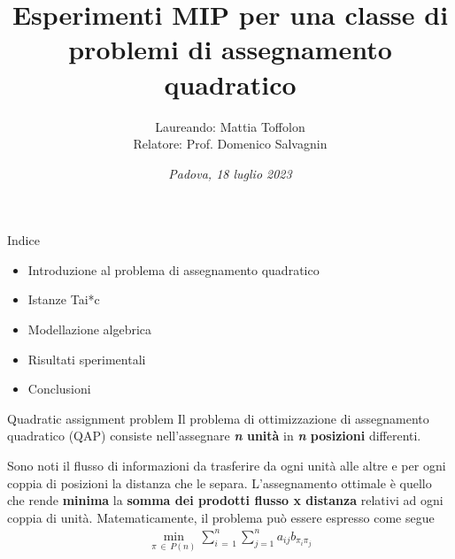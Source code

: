 \documentclass[a4paper]{beamer}
\title[title]{Esperimenti MIP per una classe di\\problemi di assegnamento quadratico}
\author[Persone]{Laureando: Mattia Toffolon\\Relatore: Prof. Domenico Salvagnin}
\date{\small \textit{Padova, 18 luglio 2023}}
\begin{document}
%
\begin{frame}
\maketitle
\end{frame}

\begin{frame}{Indice}
	\begin{itemize}
		\item Introduzione al problema di assegnamento quadratico
		\vfill
		\item Istanze Tai*c
		\vfill
		\item Modellazione algebrica
		\vfill
		\item Risultati sperimentali
		\vfill
		\item Conclusioni
		\vfill
	\end{itemize}
\end{frame}

\begin{frame}{Quadratic assignment problem}
Il problema di ottimizzazione di assegnamento quadratico (QAP) consiste nell'assegnare \textbf{\textit{n} unità} in 
\textbf{\textit{n} posizioni} differenti. 

Sono noti il flusso di informazioni da trasferire da ogni unità alle altre
e per ogni coppia di posizioni la distanza che le separa.
\newline \newline
L'assegnamento ottimale è quello che rende \textbf{minima} la \textbf{somma dei prodotti flusso x distanza} relativi ad ogni coppia
di unità.
\newline \newline
Matematicamente, il problema può essere espresso come segue
\begin{align*}
    \min_{\pi \, \in \, P(n)} \sum_{i\,=\,1}^{n} \sum_{j=1}^{n} a_{ij} b_{\pi_{i} \pi_{j}}
\end{align*}
\end{frame}
\end{document}
